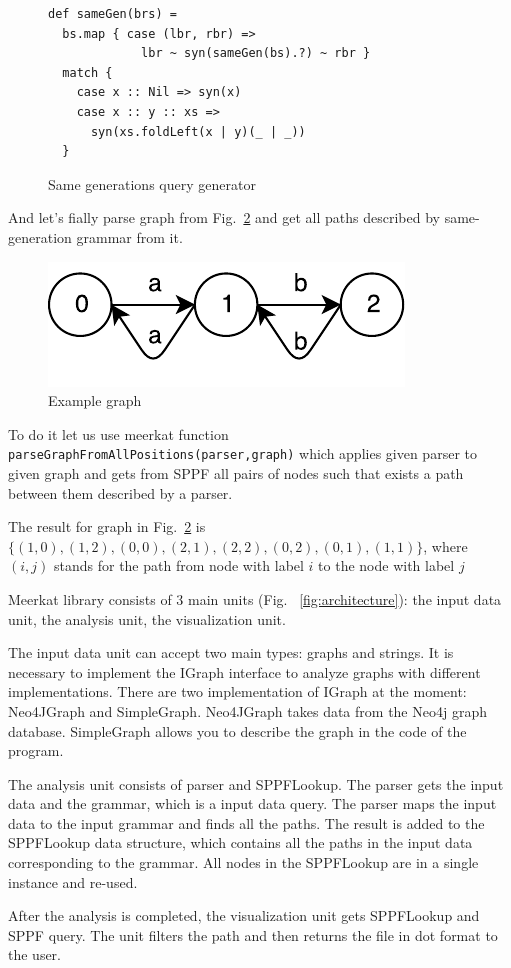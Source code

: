 \begin{figure}[h]
\begin{lstlisting}
def sameGen(brs) =
  bs.map { case (lbr, rbr) => 
             lbr ~ syn(sameGen(bs).?) ~ rbr } 
  match {
    case x :: Nil => syn(x)
    case x :: y :: xs => 
      syn(xs.foldLeft(x | y)(_ | _))
  }
\end{lstlisting}
\caption{Same generations query generator}
\label{fig:gen}
\end{figure}

And let's fially parse graph from Fig.~\ref{fig:graph} and get all paths described by same-generation grammar from it.

\begin{figure}[h]
\includegraphics{graph}
\caption{Example graph}
\label{fig:graph}
\end{figure}

To do it let us use meerkat function \lstinline{parseGraphFromAllPositions(parser,graph)} which applies given parser to given graph and gets from SPPF all pairs of nodes such that exists a path between them described by a parser.

The result for graph in Fig.~\ref{fig:graph} is $\{(1,0), (1,2), (0,0), (2,1), (2,2), (0,2), (0,1), (1,1)\}$, where $(i,j)$ stands for the path from node with label $i$ to the node with label $j$

Meerkat library consists of 3 main units (Fig. ~\ref{fig:architecture}): the input data unit, the analysis unit, the visualization unit.

The input data unit can accept two main types: graphs and strings. It is necessary to implement the IGraph interface to analyze graphs with different implementations. There are two implementation of IGraph at the moment: Neo4JGraph and SimpleGraph. Neo4JGraph takes data from the Neo4j graph database. SimpleGraph allows you to describe the graph in the code of the program.

The analysis unit consists of parser and SPPFLookup. The parser gets the input data and the grammar, which is a input data query.  The parser maps the input data to the input grammar and finds all the paths. The result is added to the SPPFLookup data structure, which contains all the paths in the input data corresponding to the grammar. All nodes in the SPPFLookup are in a single instance and re-used.

After the analysis is completed, the visualization unit gets SPPFLookup and SPPF query. The unit filters the path and then returns the file in dot format to the user.




